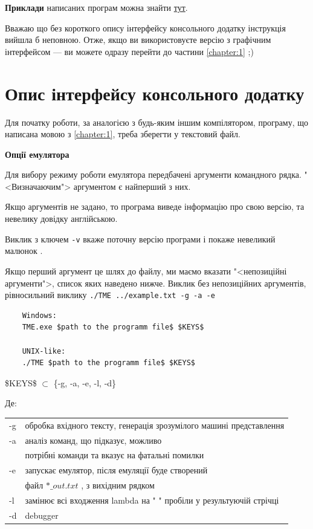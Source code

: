 \documentclass[oneside,final,14pt]{extreport}
\begin{document}
{\bf Приклади} написаних програм можна знайти \href{https://github.com/Kaifolog/TME/tree/master/examples}{тут}.

\bigskip

Вважаю що без короткого опису інтерфейсу консольного додатку інструкція вийшла б неповною. Отже, якщо ви використовуєте версію з графічним інтерфейсом --- ви можете одразу перейти до частини \ref{chapter:1} ;)

\section{Опис інтерфейсу консольного додатку}
Для початку роботи, за аналогією з будь-яким іншим компілятором, програму, що написана мовою з \ref{chapter:1}, треба зберегти у текстовий файл.

\bigskip

{ \bf Опції емулятора }
	
 Для вибору режиму роботи емулятора передбачені аргументи командного рядка. "<Визначаючим"> аргументом є найперший з них.
		
Якщо аргументів не задано, то програма виведе інформацію про свою версію, та невелику довідку англійською.

Виклик з ключем \texttt{-v} вкаже поточну версію програми і покаже невеликий малюнок \smiley{}.

Якщо перший аргумент це шлях до файлу, ми маємо вказати "<непозиційні аргументи">, список яких наведено нижче. Виклик без непозиційних аргументів, рівносильний виклику \texttt{./TME ../example.txt -g -a -e}
	
		
\begin{tcolorbox}	
\begin{verbatim}
	Windows:
	TME.exe $path to the programm file$ $KEYS$

	UNIX-like:
	./TME $path to the programm file$ $KEYS$
\end{verbatim}
\end{tcolorbox}
		

\$KEYS\$ $\subset$ \{-g, -a, -e, -l, -d\}
			
		
		Де:
		
		
\begin{tabular}{ l l }
	-g & обробка вхідного тексту, генерація зрозумілого машині представлення \\
	-a & аналіз команд, що підказує, можливо \\
	   & потрібні команди та вказує на фатальні помилки \\
	-e & запускає емулятор, після емуляції буде створений\\
	   &  файл $*\_out.txt$ , з вихідним рядком \\
	-l & замінює всі входження lambda на " " пробіли у результуючій стрічці\\
	-d & debugger\\ 
\end{tabular}
\end{document}
